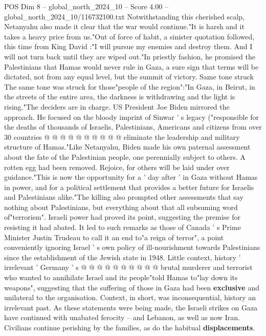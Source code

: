 \begin{textsample}{POS Dim 8 – global\_north\_2024\_10 – Score 4.00 – global\_north\_2024\_10/116732100.txt}  \label{ex:f8_pos_245}
Notwithstanding this cherished scalp, Netanyahu also made it clear that the war would continue."It is harsh and it takes a heavy price from us."Out of force of habit, a sinister quotation followed, this time from King David :"I will pursue my enemies and destroy them.
And I will not turn back until they are wiped out."In priestly fashion, he promised the Palestinians that Hamas would never rule in Gaza, a sure sign that terms will be dictated, not from any equal level, but the summit of victory.
Same tone struck The same tone was struck for those"people of the region":"In Gaza, in Beirut, in the streets of the entire area, the darkness is withdrawing and the light is rising."The deciders are in charge.
US President Joe Biden mirrored the approach.
He focused on the bloody imprint of Sinwar ' s legacy ("responsible for the deaths of thousands of Israelis, Palestinians, Americans and citizens from over 30 countries @ @ @ @ @ @ @ @ @ @ eliminate the leadership and military structure of Hamas."Like Netanyahu, Biden made his own paternal assessment about the fate of the Palestinian people, one perennially subject to others.
A rotten egg had been removed.
Rejoice, for others will be laid under over guidance."This is now the opportunity for a ' day after ' in Gaza without Hamas in power, and for a political settlement that provides a better future for Israelis and Palestinians alike."The killing also prompted other assessments that say nothing about Palestinians, but everything about that all subsuming word of"terrorism".
Israeli power had proved its point, suggesting the premise for resisting it had abated.
It led to such remarks as those of Canada ' s Prime Minister Justin Trudeau to call it an end to"a reign of terror", a point conveniently ignoring Israel ' s own policy of ill-nourishment towards Palestinians since the establishment of the Jewish state in 1948.
Little context, history ' irrelevant ' Germany ' s @ @ @ @ @ @ @ @ @ @ brutal murderer and terrorist who wanted to annihilate Israel and its people"told Hamas to"lay down its weapons", suggesting that the suffering of those in Gaza had been \textbf{exclusive} and unilateral to the organisation.
Context, in short, was inconsequential, history an irrelevant past.
As these statements were being made, the Israeli strikes on Gaza have continued with unabated ferocity -- and Lebanon, as well as now Iran.
Civilians continue perishing by the families, as do the habitual \textbf{displacements}.

\end{textsample}
